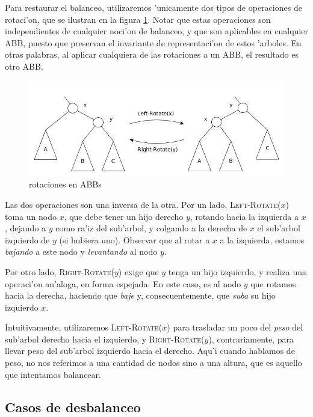 Para restaurar el balanceo, utilizaremos 'unicamente dos tipos de operaciones de rotaci'on, que se ilustran en la figura \ref{fig7}. Notar que estas operaciones son independientes de cualquier noci'on de balanceo, y que son aplicables en cualquier ABB, puesto que preservan el invariante de representaci'on de estos 'arboles. En otras palabras, al aplicar cualquiera de las rotaciones a un ABB, el resultado es otro ABB.

\begin{figure}[H]
	\begin{center}
		\includegraphics[scale=0.6]{imagenes/fig7.jpg}
	\end{center}
	\caption{rotaciones en ABBs}
	\label{fig7}
\end{figure}

Las dos operaciones son una inversa de la otra. Por un lado, \textsc{Left-Rotate}($x$) toma un nodo $x$, que debe tener un hijo derecho $y$, rotando hacia la izquierda a $x$, dejando a $y$ como ra'iz del sub'arbol, y colgando a la derecha de $x$ el sub'arbol izquierdo de $y$ (si hubiera uno). Observar que al rotar a $x$ a la izquierda, estamos \textit{bajando} a este nodo y \textit{levantando} al nodo $y$.

Por otro lado, \textsc{Right-Rotate}($y$) exige que $y$ tenga un hijo izquierdo, y realiza una operaci'on an'aloga, en forma espejada. En este caso, es al nodo $y$ que rotamos hacia la derecha, haciendo que \textit{baje} y, consecuentemente, que \textit{suba} su hijo izquierdo $x$.

Intuitivamente, utilizaremos \textsc{Left-Rotate}($x$) para trasladar un poco del \textit{peso} del sub'arbol derecho hacia el izquierdo, y \textsc{Right-Rotate}($y$), contrariamente, para llevar peso del sub'arbol izquierdo hacia el derecho. Aqu'i cuando hablamos de peso, no nos referimos a una cantidad de nodos sino a una altura, que es aquello que intentamos balancear.

\subsection{Casos de desbalanceo}

